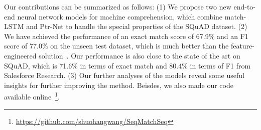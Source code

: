 \documentclass{article} \usepackage{iclr2017_conference,times}
\begin{document}
Our contributions can be summarized as follows: 
(1) We propose two new end-to-end neural network models for machine comprehension, which combine match-LSTM and Ptr-Net to handle the special properties of the SQuAD dataset.
(2) We have achieved the performance of an exact match score of 67.9\% and an F1 score of 77.0\% on the unseen test dataset, which is much better than the feature-engineered solution~\citep{rajpurkar2016squad}.
Our performance is also close to the state of the art on SQuAD, which is 71.6\% in terms of exact match and 80.4\% in terms of F1 from Salesforce Research.
(3) Our further analyses of the models reveal some useful insights for further improving the method. Beisdes, we also made
our code available online~\footnote{ \url{https://github.com/shuohangwang/SeqMatchSeq}}.
\end{document}
